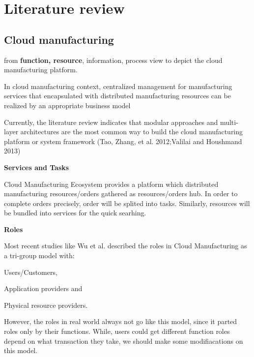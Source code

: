 \section{Literature review} %
\label{sec:literature_review}

\subsection{Cloud manufacturing} %
\label{sub:cloud_manufacturing}
from \textbf{function, resource}, information, process view to depict the cloud manufacturing platform.

In cloud manufacturing context, centralized management for manufacturing services that encapsulated with distributed manufacturing resources can be realized by an appropriate business model\cite{Xu2012}

Currently, the literature review indicates that modular approaches and multi-layer architectures are the most common way to build the cloud manufacturing platform or system framework (Tao, Zhang, et al. 2012;Valilai and Houshmand 2013)




\textbf{Services and Tasks}

Cloud Manufacturing Ecosystem provides a platform which distributed manufacturing resources/orders gathered as resources/orders hub. In order to complete orders precisely, order will be splited into tasks. Similarly, resources will be bundled into services for the quick searhing.

\textbf{Roles}

Most recent studies like Wu et al.\cite{Wu2013} described the roles in Cloud Manufacturing as a tri-group model with:\begin{inparaenum}[1)]
\item Users/Customers,
\item Application providers and
\item Physical resource providers.
\end{inparaenum}
However, the roles in real world always not go like this model, since it parted roles only by their functions. While, users could get different function roles depend on what transaction they take, we should make some modifiacations on this model.


